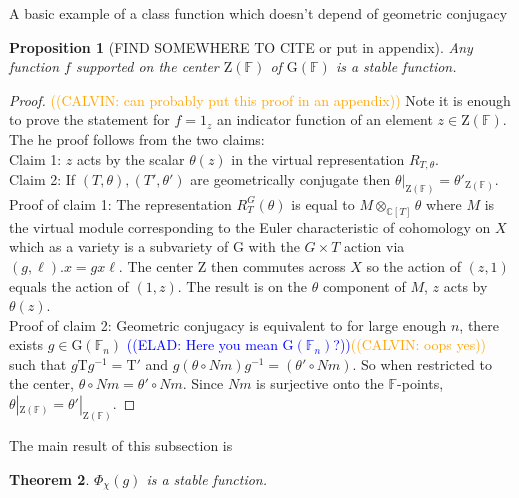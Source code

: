 \documentclass[12pt, reqno]{amsart}
\newtheorem{theorem}{Theorem}[section]
\newtheorem{proposition}[theorem]{Proposition}
\theoremstyle{definition}
\theoremstyle{definition}
\theoremstyle{definition}
\newcommand{\finiteField}{\mathbb{F}}
\newcommand{\finiteFieldExtension}[1]{\finiteField_{#1}}
\newcommand{\dblVirtualGaussSumScalar}[2]{\mathrm{g}^{\mathrm{dbl}}\left(#1, #2\right)}
\newcommand{\algebraicGroup}[1]{\boldsymbol{\mathrm{#1}}}
\newcommand{\calvin}[1]{\textcolor{orange}{\sffamily ((CALVIN: #1))}}
\newcommand{\elad}[1]{\textcolor{blue}{\sffamily ((ELAD: #1))}}
\begin{document}
A basic example of a class function which doesn't depend of geometric conjugacy 
\begin{proposition}[FIND SOMEWHERE TO CITE or put in appendix]
\label{prop:central_char}
    Any function $f$ supported on the center $\algebraicGroup{Z}(\mathbb{F})$ of $\algebraicGroup{G}(\finiteField)$ is a stable function. 
\end{proposition}
\begin{proof}
\calvin{can probably put this proof in an appendix}
Note it is enough to prove the statement for $f = 1_z$ an indicator function of an element $z \in \algebraicGroup{Z}(\mathbb{F})$. The he proof follows from the two claims:\\
Claim 1: $z$ acts by the scalar $\theta(z)$ in the virtual representation $R_{T,\theta}$.\\
Claim 2: If $(T,\theta),(T',\theta')$ are geometrically conjugate then $\theta|_{\algebraicGroup{Z}(\mathbb{F})} = \theta'_{\algebraicGroup{Z}(\mathbb{F})}$.\\
Proof of claim 1: The representation $R_T^G(\theta)$ is equal to $M \otimes_{\mathbb{C}[T]} \theta$ where $M$ is the virtual module corresponding to the Euler characteristic of cohomology on $X$ which as a variety is a subvariety of $\algebraicGroup{G}$ with the $G \times T$ action via $(g,\ell).x = gx\ell$. The center $\algebraicGroup{Z}$ then commutes across $X$ so the action of $(z,1)$ equals the action of $(1,z)$. The result is on the $\theta$ component of $M$, $z$ acts by $\theta(z)$.\\
Proof of claim 2: Geometric conjugacy is equivalent to for large enough $n$, there exists $g \in \algebraicGroup{G}(\mathbb{F}_n)$ \elad{Here you mean $\algebraicGroup{G}\left(\finiteFieldExtension{n}\right)$?}\calvin{oops yes} such that $g\algebraicGroup{T}g^{-1} = \algebraicGroup{T}'$ and $g(\theta \circ Nm) g^{-1} = (\theta' \circ Nm)$. So when restricted to the center, $\theta \circ Nm = \theta' \circ Nm$. Since $Nm$ is surjective onto the $\mathbb{F}$-points, $\theta|_{\algebraicGroup{Z}(\mathbb{F})} = \theta'|_{\algebraicGroup{Z}(\mathbb{F})}$.
\end{proof}


The main result of this subsection is 
\begin{theorem}
\label{thm:indep_geo_conj}
	$\Phi_{\chi}(g)$ is a stable function.
\end{theorem}
\end{document}
